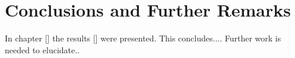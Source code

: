 \chapter{Conclusions and Further Remarks}










In chapter [] the results [] were presented. 
This concludes....
Further work is needed to elucidate..






























